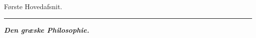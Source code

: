 \documentclass[12pt,a4paper]{book}
\newcommand{\divrule}{\begin{center}\rule{2cm}{0.4pt}\end{center}}
\newcommand{\dblrule}{\begin{center}%
  \rule{2cm}{0.4pt}\\[1.2pt]\rule{2cm}{0.4pt}\end{center}}
\begin{document}
%
\begin{center}
{\Large Første Hovedafsnit.}
\end{center}
\divrule
\begin{center}
{\Large\textbf{\emph{Den græske Philosophie.}}}
\end{center}
\end{document}
